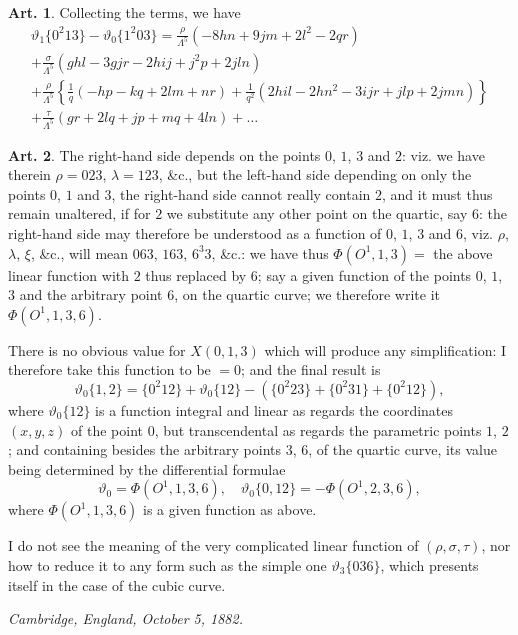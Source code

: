 \documentclass[12pt,a4paper]{article}
\theoremstyle{definition}
\newtheorem{art}{Art.}[section]
\begin{document}
\newpage
\begin{art}\label{art:72}
Collecting the terms, we have
\begin{multline*}
\vartheta_1\{0^2 13\} - \vartheta_0\{1^2 03\} = \frac{\rho}{\Lambda^5}(-8hn + 9jm + 2l^2 - 2qr) \\
+ \frac{\sigma}{\Lambda^5}(ghl - 3gjr - 2hij + j^2p + 2jln) \\
+ \frac{\rho}{\Lambda^5}\left\{\frac{1}{q}(-hp - kq + 2lm + nr) + \frac{1}{q^2}(2hil - 2hn^2 - 3ijr + jlp + 2jmn)\right\} \\
+ \frac{\tau}{\Lambda^5}(gr + 2lq + jp + mq + 4ln) + \ldots
\end{multline*}
\end{art}

\begin{art}\label{art:73}
The right-hand side depends on the points $0$, $1$, $3$ and $2$: viz. we have therein $\rho = 023$, $\lambda = 123$, \&c., but the left-hand side depending on only the points $0$, $1$ and $3$, the right-hand side cannot really contain $2$, and it must thus remain unaltered, if for $2$ we substitute any other point on the quartic, say $6$: the right-hand side may therefore be understood as a function of $0$, $1$, $3$ and $6$, viz. $\rho$, $\lambda$, $\xi$, \&c., will mean $063$, $163$, $6^3 3$, \&c.: we have thus $\Phi(O^1, 1, 3) = $ the above linear function with $2$ thus replaced by $6$; say a given function of the points $0$, $1$, $3$ and the arbitrary point $6$, on the quartic curve; we therefore write it $\Phi(O^1, 1, 3, 6)$.

There is no obvious value for $X(0, 1, 3)$ which will produce any simplification: I therefore take this function to be $= 0$; and the final result is
\[
\vartheta_0\{1, 2\} = \{0^2 12\} + \vartheta_0\{12\} - (\{0^2 23\} + \{0^2 31\} + \{0^2 12\}),
\]
where $\vartheta_0\{12\}$ is a function integral and linear as regards the coordinates $(x, y, z)$ of the point $0$, but transcendental as regards the parametric points $1$, $2$; and containing besides the arbitrary points $3$, $6$, of the quartic curve, its value being determined by the differential formulae
\[
\vartheta_0 = \Phi(O^1, 1, 3, 6), \quad \vartheta_0\{0, 12\} = -\Phi(O^1, 2, 3, 6),
\]
where $\Phi(O^1, 1, 3, 6)$ is a given function as above.

I do not see the meaning of the very complicated linear function of $(\rho, \sigma, \tau)$, nor how to reduce it to any form such as the simple one $\vartheta_3\{036\}$, which presents itself in the case of the cubic curve.

\textit{Cambridge, England, October 5, 1882.}
\end{art}
\end{document}
